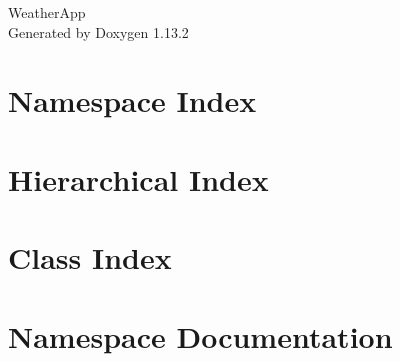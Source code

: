 \documentclass[twoside]{book}
\newcommand{\+}{\discretionary{\mbox{\scriptsize$\hookleftarrow$}}{}{}}
\newcommand{\clearemptydoublepage}{%
    \newpage{\pagestyle{empty}\cleardoublepage}%
  }
\begin{document}
  \raggedbottom
    \hypersetup{pageanchor=false,
                bookmarksnumbered=true,
                pdfencoding=unicode
               }
  \begin{titlepage}
  \vspace*{7cm}
  \begin{center}%
  {\Large Weather\+App}\\
  \vspace*{1cm}
  {\large Generated by Doxygen 1.13.2}\\
  \end{center}
  \end{titlepage}
  \clearemptydoublepage
  \tableofcontents
  \clearemptydoublepage
  \hypersetup{pageanchor=true}
\chapter{Namespace Index}

\chapter{Hierarchical Index}

\chapter{Class Index}

\chapter{Namespace Documentation}










\end{document}
